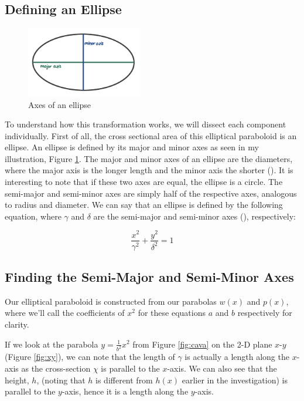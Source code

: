 \documentclass[12pt]{article}
\begin{document}
\subsection{Defining an Ellipse}

\begin{figure}[h]
    \centering
    \includegraphics[width=0.45\textwidth]{images/ellipse def.jpg}
    \caption{Axes of an ellipse}
    \label{fig:elip.ax}
\end{figure}


To understand how this transformation works, we will dissect each component individually. First of all, the cross sectional area of this elliptical paraboloid is an ellipse. An ellipse is defined by its major and minor axes as seen in my illustration, Figure \ref{fig:elip.ax}. The major and minor axes of an ellipse are the diameters, where the major axis is the longer length and the minor axis the shorter (\citeauthor{weisstein}). It is interesting to note that if these two axes are equal, the ellipse is a circle. The semi-major and semi-minor axes are simply half of the respective axes, analogous to radius and diameter. We can say that an ellipse is defined by the following equation, where  $\gamma$ and $\delta$ are the semi-major and semi-minor axes (\citeauthor{weisstein}), respectively:

\begin{equation}\label{ellipse}
    \boxed{\frac{x^2}{\gamma^2}+\frac{y^2}{\delta^2}=1}
\end{equation}

\subsection{Finding the Semi-Major and Semi-Minor Axes}

Our elliptical paraboloid is constructed from our parabolas $w(x)$ and $p(x)$, where we'll call the coefficients of $x^2$ for these equations $a$ and $b$ respectively for clarity. 

If we look at the parabola $y=\frac{1}{b^2}x^2$ from Figure \ref{fig:cava} on the 2-D plane $x$-$y$ (Figure \ref{fig:xy}), we can note that the length of $\gamma$ is actually a length along the $x$-axis as the cross-section $\chi$ is parallel to the $x$-axis. We can also see that the height, $h$, (noting that $h$ is different from $h(x)$ earlier in the investigation) is parallel to the $y$-axis, hence it is a length along the $y$-axis. 
\end{document}
